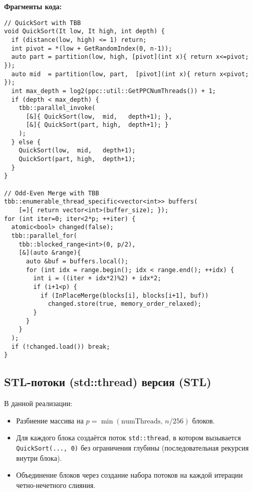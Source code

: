 \documentclass[12pt]{article}
\begin{document}
\noindent\textbf{Фрагменты кода:}
\lstset{language=C++}
\begin{lstlisting}
// QuickSort with TBB
void QuickSort(It low, It high, int depth) {
  if (distance(low, high) <= 1) return;
  int pivot = *(low + GetRandomIndex(0, n-1));
  auto part = partition(low, high, [pivot](int x){ return x<=pivot; });
  auto mid  = partition(low, part,  [pivot](int x){ return x<pivot; });
  int max_depth = log2(ppc::util::GetPPCNumThreads()) + 1;
  if (depth < max_depth) {
    tbb::parallel_invoke(
      [&]{ QuickSort(low,  mid,   depth+1); },
      [&]{ QuickSort(part, high,  depth+1); }
    );
  } else {
    QuickSort(low,  mid,   depth+1);
    QuickSort(part, high,  depth+1);
  }
}

// Odd-Even Merge with TBB
tbb::enumerable_thread_specific<vector<int>> buffers(
    [=]{ return vector<int>(buffer_size); });
for (int iter=0; iter<2*p; ++iter) {
  atomic<bool> changed(false);
  tbb::parallel_for(
    tbb::blocked_range<int>(0, p/2),
    [&](auto &range){
      auto &buf = buffers.local();
      for (int idx = range.begin(); idx < range.end(); ++idx) {
        int i = ((iter + idx*2)%2) + idx*2;
        if (i+1<p) {
          if (InPlaceMerge(blocks[i], blocks[i+1], buf))
            changed.store(true, memory_order_relaxed);
        }
      }
    }
  );
  if (!changed.load()) break;
}
\end{lstlisting}

\subsection{STL-потоки (std::thread) версия (STL)}
\hspace*{1.25em}В данной реализации:
\begin{itemize}
    \item Разбиение массива на $p = \min(\text{numThreads},\, n/256)$ блоков.
    \item Для каждого блока создаётся поток \texttt{std::thread}, в котором вызывается \texttt{QuickSort(..., 0)} без ограничения глубины (последовательная рекурсия внутри блока).
    \item Объединение блоков через создание набора потоков на каждой итерации четно-нечетного слияния.
\end{itemize}
\end{document}
